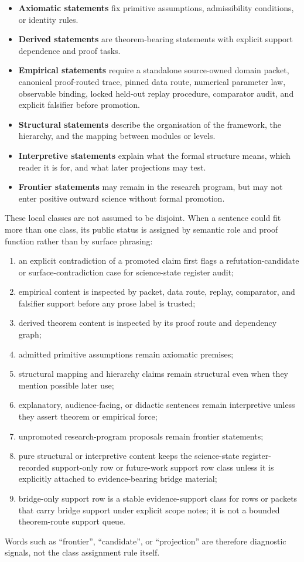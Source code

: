 \begin{itemize}
\item \textbf{Axiomatic statements} fix primitive assumptions, admissibility
      conditions, or identity rules.
\item \textbf{Derived statements} are theorem-bearing statements with explicit support
      dependence and proof tasks.
\item \textbf{Empirical statements} require a standalone source-owned domain
      packet, canonical proof-routed trace, pinned data route, numerical
      parameter law, observable binding, locked held-out replay procedure,
      comparator audit, and explicit falsifier before promotion.
\item \textbf{Structural statements} describe the organisation of the framework,
      the hierarchy, and the mapping between modules or levels.
\item \textbf{Interpretive statements} explain what the formal structure means,
      which reader it is for, and what later projections may test.
\item \textbf{Frontier statements} may remain in the research program, but may
      not enter positive outward science without formal promotion.
\end{itemize}
These local classes are not assumed to be disjoint. When a sentence could fit
more than one class, its public status is assigned by semantic role and proof
function rather than by surface phrasing:
\begin{enumerate}
\item an explicit contradiction of a promoted claim first flags a
      refutation-candidate or surface-contradiction case for science-state register audit;
\item empirical content is inspected by packet, data route, replay,
      comparator, and falsifier support before any prose label is trusted;
\item derived theorem content is inspected by its proof route and dependency
      graph;
\item admitted primitive assumptions remain axiomatic premises;
\item structural mapping and hierarchy claims remain structural even when
      they mention possible later use;
\item explanatory, audience-facing, or didactic sentences remain interpretive
      unless they assert theorem or empirical force;
\item unpromoted research-program proposals remain frontier statements;
\item pure structural or interpretive content keeps the science-state register-recorded
      support-only row or future-work support row class unless it is explicitly
      attached to evidence-bearing bridge material;
\item bridge-only support row is a stable evidence-support class for rows or
      packets that carry bridge support under explicit scope notes; it is not a
      bounded theorem-route support queue.
\end{enumerate}
Words such as ``frontier'', ``candidate'', or ``projection'' are therefore
diagnostic signals, not the class assignment rule itself.

